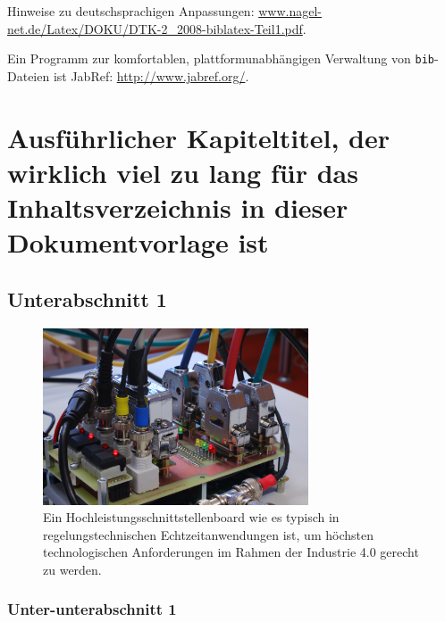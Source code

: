 \documentclass[arbeit=master,oneside,BCOR=12mm]{ArbeitRST}
\begin{document}
Hinweise zu deutschsprachigen Anpassungen: \url{www.nagel-net.de/Latex/DOKU/DTK-2_2008-biblatex-Teil1.pdf}.

Ein Programm zur komfortablen, plattformunabhängigen Verwaltung von \texttt{bib}-Dateien ist JabRef: \url{http://www.jabref.org/}.



\chapter[kurzer Titel]{Ausführlicher Kapiteltitel, der wirklich viel zu lang für das Inhaltsverzeichnis in dieser Dokumentvorlage ist}



\Blindtext[2][1]

\section{Unterabschnitt 1}

\Blindtext[2][2]

\begin{figure}[ht]
\centering
\includegraphics[width=0.7\textwidth]{bild}
\caption{Ein Hochleistungsschnittstellenboard wie es typisch in regelungstechnischen Echtzeitanwendungen ist, um höchsten technologischen Anforderungen im Rahmen der Industrie 4.0 gerecht zu werden.}
\label{fig:Bild}
\end{figure}


\subsection{Unter-unterabschnitt 1}

\blindmathtrue
\Blindtext[2][4]
\end{document}
